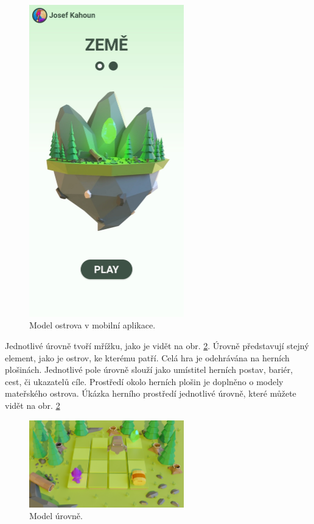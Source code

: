 \begin{figure}[h]
    \centering
    \includegraphics[width=0.6\textwidth]{img/mobilni-aplikace-ostrov.jpg}
    \caption{Model ostrova v mobilní aplikace.}
    \label{fig:mobilni-aplikace-ostrov}
\end{figure}

Jednotlivé úrovně tvoří mřížku, jako je vidět na obr. \ref{fig:model-levelu}. Úrovně představují stejný element, jako je ostrov, ke kterému patří. Celá hra je odehrávána na herních plošinách. Jednotlivé pole úrovně slouží jako umístitel herních postav, bariér, cest, či ukazatelů cíle. Prostředí okolo herních plošin je doplněno o modely mateřského ostrova. Úkázka herního prostředí jednotlivé úrovně, které můžete vidět na obr. \ref{fig:model-levelu}

\begin{figure}[h]
    \centering
    \includegraphics[width=0.6\textwidth]{img/model-levelu.png}
    \caption{Model úrovně.}
    \label{fig:model-levelu}
\end{figure}